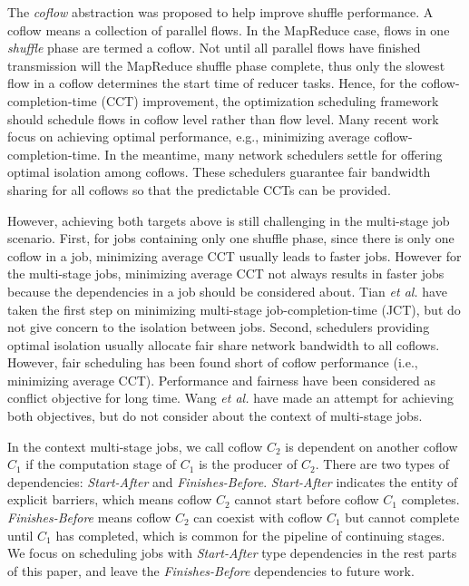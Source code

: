 \documentclass[10pt, conference, letterpaper]{IEEEtran}
\begin{document}
The \emph{coflow} abstraction was proposed to help improve shuffle performance. A coflow means a collection of parallel flows\cite{coflow}. In the MapReduce case, flows in one \emph{shuffle} phase are termed a coflow. %
Not until all parallel flows have finished transmission will the MapReduce shuffle phase complete, thus only the slowest flow %
in a coflow determines the start time of reducer tasks. Hence, for the coflow-completion-time (CCT) improvement, the optimization scheduling framework should schedule flows in coflow level rather than flow level. Many recent work focus on achieving optimal performance, e.g., minimizing average coflow-completion-time\cite{varys,aalo,coda,barrat,stream}. In the meantime, many network schedulers settle for offering optimal isolation among coflows\cite{HUG,DRF,faircloud,fair}. These schedulers guarantee fair bandwidth sharing for all coflows so that the predictable CCTs can be provided.  

However, achieving both targets above is still challenging in the multi-stage job scenario. First, for jobs containing only one shuffle phase, since there is only one coflow in a job, minimizing average CCT usually leads to faster jobs. However for the multi-stage jobs, minimizing average CCT not always results in faster jobs because the dependencies in a job should be considered about. Tian \emph{et al.}\cite{bingchuan} have taken the first step on minimizing multi-stage job-completion-time (JCT), but do not give concern to the isolation between jobs. Second, schedulers providing optimal isolation usually allocate fair share network bandwidth to all coflows. %
However, fair scheduling has been found short of coflow performance (i.e., minimizing average CCT)\cite{HUG}. Performance and fairness have been considered as conflict objective for long time. Wang \emph{et al.}\cite{utopia} have made an attempt for achieving both objectives, but do not consider about the context of multi-stage jobs.

In the context multi-stage jobs, we call coflow $C_2$ is dependent on another coflow $C_1$ if the computation stage of $C_1$ is the producer of $C_2$. There are two types of dependencies: \emph{Start-After} and \emph{Finishes-Before}. \emph{Start-After} indicates the entity of explicit barriers\cite{Hadoop}, which means coflow $C_2$ cannot start before coflow $C_1$ completes. \emph{Finishes-Before} means coflow $C_2$ can coexist with coflow $C_1$ but cannot complete until $C_1$ has completed, which is common for the pipeline of continuing stages\cite{dryad}. We focus on scheduling jobs with \emph{Start-After} type dependencies in the rest parts of this paper, and leave the \emph{Finishes-Before} dependencies to future work.
\end{document}
